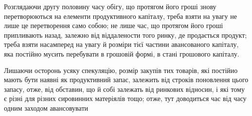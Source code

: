 Розглядаючи другу половину часу обігу, що протягом його гроші
знову перетворюються на елементи продуктивного капіталу, треба взяти
на увагу не лише це перетворення само собою; не лише час, що протягом
його гроші припливають назад, залежно від віддалености того
ринку, де продається продукт; треба взяти насамперед на увагу й розміри
тієї частини авансованого капіталу, яка постійно мусить перебувати в
грошовій формі, в стані грошового капіталу.

Лишаючи осторонь усяку спекуляцію, розмір закупів тих товарів, які
постійио мають бути наявні як продуктивний запас, залежить від строків
поновлення цього запасу, отже, від обставин, що й собі залежать від
ринкових відносин, і які тому є різні для різних сировинних матеріялів
тощо; отже, тут доводиться час від часу одним заходом авансовувати
\parbreak{}  %
